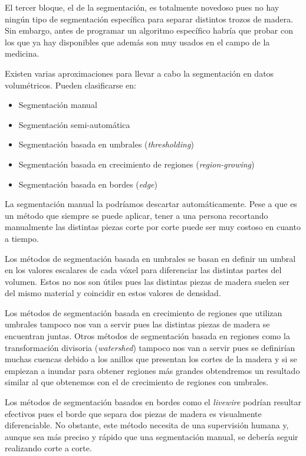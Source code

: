 El tercer bloque, el de la segmentación, es totalmente novedoso pues no hay ningún tipo de segmentación específica para separar distintos trozos de madera. Sin embargo, antes de programar un algoritmo específico habría que probar con los que ya hay disponibles que además son muy usados en el campo de la medicina.

Existen varias aproximaciones para llevar a cabo la segmentación en datos volumétricos. Pueden clasificarse en:

\begin{itemize}
	\item Segmentación manual
	\item Segmentación semi-automática
	\item Segmentación basada en umbrales (\textit{thresholding})
	\item Segmentación basada en crecimiento de regiones (\textit{region-growing})
	\item Segmentación basada en bordes (\textit{edge})
\end{itemize}

La segmentación manual la podríamos descartar automáticamente. Pese a que es un método que siempre se puede aplicar, tener a una persona recortando manualmente las distintas piezas corte por corte puede ser muy costoso en cuanto a tiempo.

Los métodos de segmentación basada en umbrales \cite{otsu79} se basan en definir un umbral en los valores escalares de cada vóxel para diferenciar las distintas partes del volumen. Estos no nos son útiles pues las distintas piezas de madera suelen ser del mismo material y coincidir en estos valores de densidad.

Los métodos de segmentación basada en crecimiento de regiones que utilizan umbrales \cite{haralick85} tampoco nos van a servir pues las distintas piezas de madera se encuentran juntas. Otros métodos de segmentación basada en regiones como la transformación divisoria (\textit{watershed}) \cite{beucher79} tampoco nos van a servir pues se definirían muchas cuencas debido a los anillos que presentan los cortes de la madera y si se empiezan a inundar para obtener regiones más grandes obtendremos un resultado similar al que obtenemos con el de crecimiento de regiones con umbrales.

Los métodos de segmentación basados en bordes como el \textit{livewire} \cite{mortensen95} podrían resultar efectivos pues el borde que separa dos piezas de madera es visualmente diferenciable. No obstante, este método necesita de una supervisión humana y, aunque sea más preciso y rápido que una segmentación manual, se debería seguir realizando corte a corte.

